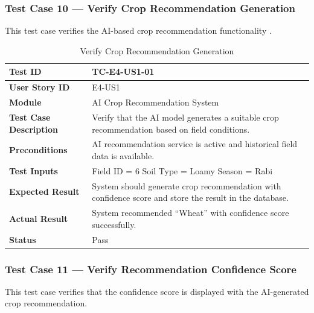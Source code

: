 \subsubsection{Test Case 10 --- Verify Crop Recommendation 
Generation}

This test case verifies the AI-based crop recommendation 
functionality \cite{musanase2023data}.

\begin{longtable}{|p{4cm}|p{8cm}|}
\caption{Verify Crop Recommendation Generation}
\label{tab:tc_crop} \\
\hline
\textbf{Test ID} & TC-E4-US1-01 \\ \hline
\textbf{User Story ID} & E4-US1 \\ \hline
\textbf{Module} & AI Crop Recommendation System \\ \hline
\textbf{Test Case Description} & Verify that the AI model generates 
a suitable crop recommendation based on field conditions. \\ \hline
\textbf{Preconditions} & AI recommendation service is active and 
historical field data is available. \\ \hline
\textbf{Test Inputs} &
Field ID = 6 \newline
Soil Type = Loamy \newline
Season = Rabi \\ \hline
\textbf{Expected Result} & System should generate crop 
recommendation with confidence score and store the result in the 
database. \\ \hline
\textbf{Actual Result} & System recommended ``Wheat'' with confidence 
score successfully. \\ \hline
\textbf{Status} & Pass \\ \hline
\end{longtable}

\subsubsection{Test Case 11 --- Verify Recommendation Confidence 
Score}

This test case verifies that the confidence score is displayed with 
the AI-generated crop recommendation.

